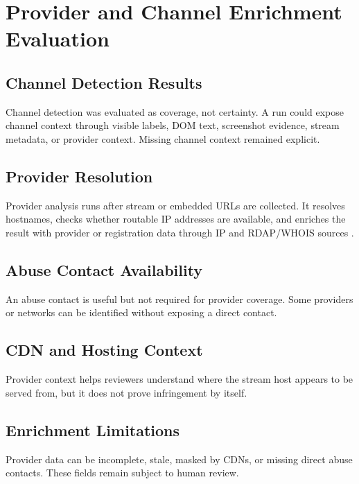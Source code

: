 \section{Provider and Channel Enrichment Evaluation}

\subsection{Channel Detection Results}

Channel detection was evaluated as coverage, not certainty. A run could expose
channel context through visible labels, DOM text, screenshot evidence, stream
metadata, or provider context. Missing channel context remained explicit.

\subsection{Provider Resolution}

Provider analysis runs after stream or embedded URLs are collected. It resolves
hostnames, checks whether routable IP addresses are available, and enriches the
result with provider or registration data through IP and RDAP/WHOIS sources
\cite{ipinfo-api,icann-rdap}.

\subsection{Abuse Contact Availability}

An abuse contact is useful but not required for provider coverage. Some
providers or networks can be identified without exposing a direct contact.

\subsection{CDN and Hosting Context}

Provider context helps reviewers understand where the stream host appears to be
served from, but it does not prove infringement by itself.

\subsection{Enrichment Limitations}

Provider data can be incomplete, stale, masked by CDNs, or missing direct abuse
contacts. These fields remain subject to human review.

